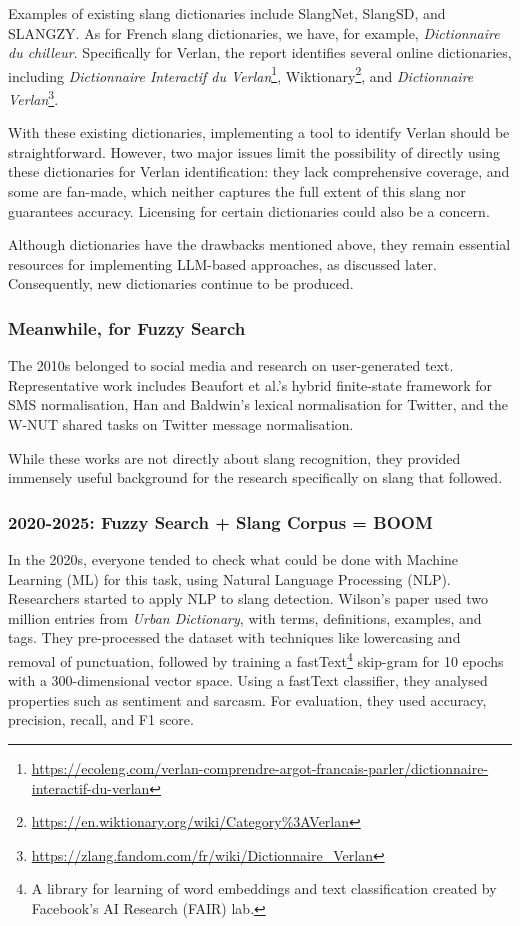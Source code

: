 \documentclass[12pt]{article}
\begin{document}
Examples of existing slang dictionaries include SlangNet, SlangSD, and SLANGZY\cite{dhuliawala2016slangnet, wu2018slangsd, gupta2019slangzy}. As for French slang dictionaries, we have, for example, \textit{Dictionnaire du chilleur}\cite{dictionnaire2024chilleur}. Specifically for Verlan, the report identifies several online dictionaries, including \textit{Dictionnaire Interactif du Verlan}\footnote{\url{https://ecoleng.com/verlan-comprendre-argot-francais-parler/dictionnaire-interactif-du-verlan}}, Wiktionary\footnote{\url{https://en.wiktionary.org/wiki/Category\%3AVerlan}}, and \textit{Dictionnaire Verlan}\footnote{\url{https://zlang.fandom.com/fr/wiki/Dictionnaire_Verlan}}.

With these existing dictionaries, implementing a tool to identify Verlan should be straightforward. However, two major issues limit the possibility of directly using these dictionaries for Verlan identification: they lack comprehensive coverage, and some are fan-made, which neither captures the full extent of this slang nor guarantees accuracy. Licensing for certain dictionaries could also be a concern.

Although dictionaries have the drawbacks mentioned above, they remain essential resources for implementing LLM-based approaches, as discussed later. Consequently, new dictionaries continue to be produced.

\subsubsection{Meanwhile, for Fuzzy Search}

The 2010s belonged to social media and research on user-generated text. Representative work includes Beaufort et al.'s hybrid finite-state framework for SMS normalisation, Han and Baldwin's lexical normalisation for Twitter, and the W-NUT shared tasks on Twitter message normalisation\cite{beaufort2010hybrid, han2011lexical, baldwin2015shared}.

While these works are not directly about slang recognition, they provided immensely useful background for the research specifically on slang that followed.

\subsubsection{2020-2025: Fuzzy Search + Slang Corpus = BOOM}

In the 2020s, everyone tended to check what could be done with Machine Learning (ML) for this task, using Natural Language Processing (NLP). Researchers started to apply NLP to slang detection. Wilson's paper used two million entries from \textit{Urban Dictionary}, with terms, definitions, examples, and tags\cite{urban2020embeddings}. They pre-processed the dataset with techniques like lowercasing and removal of punctuation, followed by training a fastText\footnote{A library for learning of word embeddings and text classification created by Facebook's AI Research (FAIR) lab.} skip-gram for 10 epochs with a 300-dimensional vector space. Using a fastText classifier, they analysed properties such as sentiment and sarcasm. For evaluation, they used accuracy, precision, recall, and F1 score.
\end{document}
